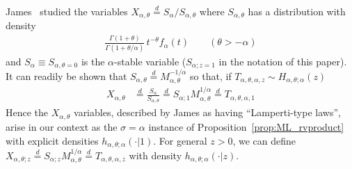 \documentclass[a4paper,12pt]{article}
\begin{document}
{{James~\cite{James_Lamperti}  studied  the variables $X_{\alpha,\theta} \overset{d}{=} S_{\alpha}/S_{\alpha,\theta}$
where $S_{\alpha,\theta}$ has a distribution with density
\begin{align*}
 \frac{\Gamma(1+\theta)}{\Gamma(1+\theta/\alpha)} \,  t^{-\theta} f_\alpha(t) \qquad (\theta>-\alpha)
 \end{align*}
and $S_\alpha \equiv S_{\alpha,\theta=0}$ is the $\alpha$-stable variable ($S_{\alpha;z=1}$ in the notation of this paper).
It can readily be shown that  $S_{\alpha,\theta}  \overset{d}{=} M_{\alpha,\theta}^{-1/\alpha}$ so that,
if $T_{\alpha,\theta,\alpha,z} \sim H_{\alpha,\theta; \alpha}(z)$
\begin{align}
 X_{\alpha,\theta}  &\overset{d}{=} \frac{S_{\alpha}}{S_{\alpha,\theta}} \overset{d}{=} S_{\alpha;1} M_{\alpha,\theta}^{1/\alpha}
\overset{d}{=} T_{\alpha,\theta,\alpha,1} %
\label{eq:Lamperti_type_rv}
\end{align}
Hence the $X_{\alpha,\theta}$ variables, described by James  as  having  ``Lamperti-type laws'', arise in our context as the $\sigma=\alpha$ instance of 
Proposition~\ref{prop:ML_rvproduct} with explicit densities $h_{\alpha,\theta; \alpha}(\cdot \vert 1)$.
For general $z>0$, we can define $X_{\alpha,\theta;z} \overset{d}{=} S_{\alpha;z} M_{\alpha,\theta}^{1/\alpha}
\overset{d}{=} T_{\alpha,\theta,\alpha,z}$ %
with density $h_{\alpha,\theta; \alpha}(\cdot \vert z)$.

}}
\end{document}
